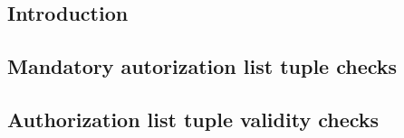 \subsection{Introduction}                               \label{rlp auth: comparisons: intro}              
\subsection{Mandatory autorization list tuple checks}   \label{rlp auth: comparisons: mandatory checks}   
\subsection{Authorization list tuple validity checks}   \label{rlp auth: comparisons: validity checks}    
